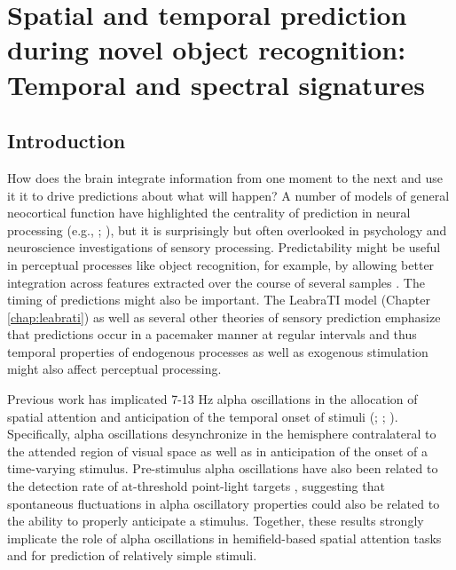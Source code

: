 \documentclass[dwyatte_dissertation.tex]{subfiles}
\begin{document}
\sloppy

\chapter{Spatial and temporal prediction during novel object recognition: Temporal and spectral signatures}
\label{chap:pleast}

\section{Introduction}
How does the brain integrate information from one moment to the next and use it it to drive predictions about what will happen? A number of models of general neocortical function have highlighted the centrality of prediction in neural processing (e.g., ; ), but it is surprisingly but often overlooked in psychology and neuroscience investigations of sensory processing. Predictability might be useful in perceptual processes like object recognition, for example, by allowing better integration across features extracted over the course of several samples \cite{Foldiak91,StringerPerryRollsEtAl06,WallisBaddeley97,IsikLeiboPoggio12}. The timing of predictions might also be important. The LeabraTI model (Chapter \ref{chap:leabrati}) as well as several other theories of sensory prediction \cite{ArnalGiraud12,GiraudPoeppel12} emphasize that predictions occur in a pacemaker manner at regular intervals and thus temporal properties of endogenous processes as well as exogenous stimulation might also affect perceptual processing.

Previous work has implicated 7-13 Hz alpha oscillations in the allocation of spatial attention and anticipation of the temporal onset of stimuli (; ; ). Specifically, alpha oscillations desynchronize in the hemisphere contralateral to the attended region of visual space as well as in anticipation of the onset of a time-varying stimulus. Pre-stimulus alpha oscillations have also been related to the detection rate of at-threshold point-light targets \cite{MathewsonGrattonFabianiEtAl09,BuschDuboisVanrullen09}, suggesting that spontaneous fluctuations in alpha oscillatory properties could also be related to the ability to properly anticipate a stimulus. Together, these results strongly implicate the role of alpha oscillations in hemifield-based spatial attention tasks and for prediction of relatively simple stimuli. 
\end{document}
